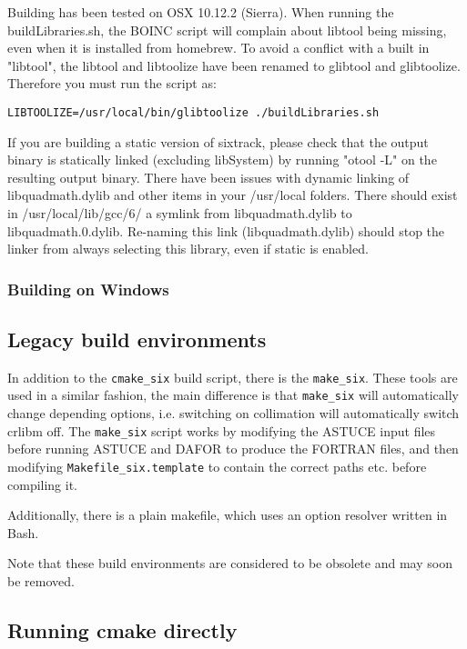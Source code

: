 \documentclass[english,BCOR=0mm,DIV=18]{scrartcl}
\begin{document}
Building has been tested on OSX 10.12.2 (Sierra).
When running the buildLibraries.sh, the BOINC script will complain about libtool being missing, even when it is installed from homebrew.
To avoid a conflict with a built in "libtool", the libtool and libtoolize have been renamed to glibtool and glibtoolize.
Therefore you must run the script as:
\begin{lstlisting}
LIBTOOLIZE=/usr/local/bin/glibtoolize ./buildLibraries.sh
\end{lstlisting}

If you are building a static version of sixtrack, please check that the output binary is statically linked (excluding libSystem) by running "otool -L" on the resulting output binary.
There have been issues with dynamic linking of libquadmath.dylib and other items in your /usr/local folders.
There should exist in /usr/local/lib/gcc/6/ a symlink from libquadmath.dylib to libquadmath.0.dylib.
Re-naming this link (libquadmath.dylib) should stop the linker from always selecting this library, even if static is enabled.

\subsubsection{Building on Windows}


\subsection{Legacy build environments}

In addition to the \texttt{cmake\_six} build script, there is the \texttt{make\_six}.
These tools are used in a similar fashion, the main difference is that \texttt{make\_six} will automatically change depending options, i.e. switching on collimation will automatically switch crlibm off.
The \texttt{make\_six} script works by modifying the ASTUCE input files before running ASTUCE and DAFOR to produce the FORTRAN files, and then modifying \texttt{Makefile\_six.template} to contain the correct paths etc. before compiling it.

Additionally, there is a plain makefile, which uses an option resolver written in Bash.

Note that these build environments are considered to be obsolete and may soon be removed.

\subsection{Running cmake directly}
\end{document}
